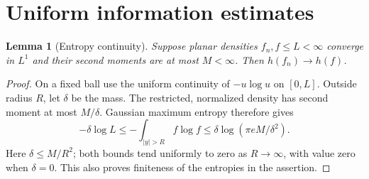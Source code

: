 \documentclass[11pt]{article}
\newtheorem{lemma}[theorem]{Lemma}
\begin{document}
\section{Uniform information estimates}

\begin{lemma}[Entropy continuity]\label{lem:entropy}
Suppose planar densities \(f_n,f\leq L<\infty\) converge in \(L^1\)
and their second moments are at most \(M<\infty\). Then
\(h(f_n)\to h(f)\).
\end{lemma}
\begin{proof}
On a fixed ball use the uniform continuity of \(-u\log u\) on \([0,L]\).
Outside radius \(R\), let \(\delta\) be the mass. The restricted,
normalized density has second moment at most \(M/\delta\). Gaussian
maximum entropy therefore gives
\[
 -\delta\log L\leq-\int_{|y|>R} f\log f
 \leq\delta\log(\pi eM/\delta^2).
\]
Here \(\delta\leq M/R^2\); both bounds tend uniformly to zero as
\(R\to\infty\), with value zero when \(\delta=0\).
This also proves finiteness of the entropies in the assertion.
\end{proof}
\end{document}
